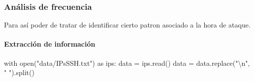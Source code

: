 \documentclass[
  letterpaper,
  DIV=11,
  numbers=noendperiod]{scrartcl}
\let\oldparagraph\paragraph
\renewcommand{\paragraph}[1]{\oldparagraph{#1}\mbox{}}
\newenvironment{Shaded}{\begin{snugshade}}{\end{snugshade}}
\newcommand{\BuiltInTok}[1]{\textcolor[rgb]{0.00,0.23,0.31}{#1}}
\newcommand{\CharTok}[1]{\textcolor[rgb]{0.13,0.47,0.30}{#1}}
\newcommand{\ControlFlowTok}[1]{\textcolor[rgb]{0.00,0.23,0.31}{#1}}
\newcommand{\ImportTok}[1]{\textcolor[rgb]{0.00,0.46,0.62}{#1}}
\newcommand{\NormalTok}[1]{\textcolor[rgb]{0.00,0.23,0.31}{#1}}
\newcommand{\OperatorTok}[1]{\textcolor[rgb]{0.37,0.37,0.37}{#1}}
\newcommand{\SpecialCharTok}[1]{\textcolor[rgb]{0.37,0.37,0.37}{#1}}
\newcommand{\StringTok}[1]{\textcolor[rgb]{0.13,0.47,0.30}{#1}}
\begin{document}
\hypertarget{anuxe1lisis-de-frecuencia}{%
\subsubsection{Análisis de frecuencia}\label{anuxe1lisis-de-frecuencia}}

Para así poder de tratar de identificar cierto patron asociado a la hora
de ataque.

\hypertarget{extracciuxf3n-de-informaciuxf3n}{%
\paragraph{Extracción de
información}\label{extracciuxf3n-de-informaciuxf3n}}

\begin{Shaded}
\end{Shaded}

\begin{Shaded}
\begin{Highlighting}[]
\ControlFlowTok{with} \BuiltInTok{open}\NormalTok{(}\StringTok{"data/IPsSSH.txt"}\NormalTok{) }\ImportTok{as}\NormalTok{ ips:}
\NormalTok{    data }\OperatorTok{=}\NormalTok{ ips.read()}
\NormalTok{    data }\OperatorTok{=}\NormalTok{ data.replace(}\StringTok{"}\CharTok{\textbackslash{}n}\StringTok{"}\NormalTok{, }\StringTok{" "}\NormalTok{).split()}
\end{Highlighting}
\end{Shaded}
\end{document}
